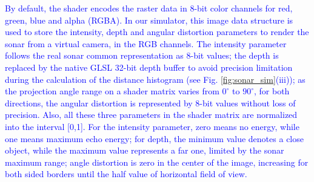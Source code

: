 \documentclass[final,5p,times]{elsarticle}
\begin{document}
\textcolor{blue}{By default, the shader encodes the raster data in 8-bit color channels for red, green, blue and alpha (RGBA). In our simulator, this image data structure is used to store the intensity, depth and angular distortion parameters to render the sonar from a virtual camera, in the RGB channels. The intensity parameter follows the real sonar common representation as 8-bit values; the depth is replaced by the native GLSL 32-bit depth buffer to avoid precision limitation during the calculation of the distance histogram (see Fig. \ref{fig:sonar_sim}(iii)); as the projection angle range on a shader matrix varies from $0^{\circ}$ to $90^{\circ}$, for both directions, the angular distortion is represented by 8-bit values without loss of precision. Also, all these three parameters in the shader matrix are normalized into the interval [0,1]. For the intensity parameter, zero means no energy, while one means maximum echo energy; for depth, the minimum value denotes a close object, while the maximum value represents a far one, limited by the sonar maximum range; angle distortion is zero in the center of the image, increasing for both sided borders until the half value of horizontal field of view.}
\end{document}
